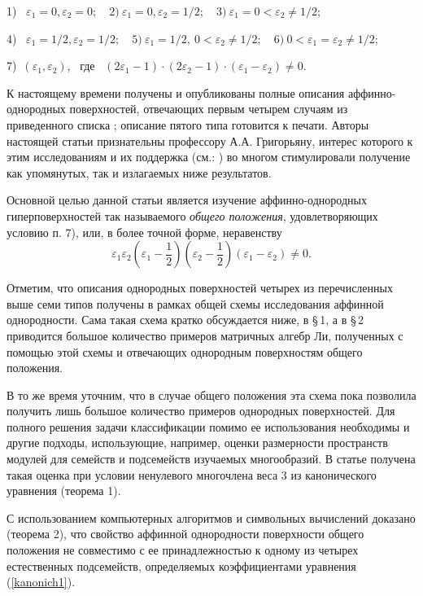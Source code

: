 1) \ $ \varepsilon_{1} = 0, \varepsilon_{2} = 0;
\quad
2) \ \varepsilon_{1} = 0, \varepsilon_{2} = 1/2;
\quad
3) \ \varepsilon_{1} = 0 < \varepsilon_{2} \ne 1/2 $;

4) \ $ \varepsilon_{1} = 1/2, \varepsilon_{2} = 1/2;
\quad
5) \ \varepsilon_{1} = 1/2, \ 0 < \varepsilon_{2} \ne 1/2;
\quad
6) \ 0 < \varepsilon_{1} = \varepsilon_{2} \ne 1/2 $;

7)\ $ (\varepsilon_{1}, \varepsilon_{2}) $, \ где
\
$ ( 2 \varepsilon_{1} - 1 )\cdot( 2 \varepsilon_{2} - 1 )\cdot
   (\varepsilon_{1} - \varepsilon_{2} ) \ne 0
$.


  К настоящему времени получены и опубликованы
полные описания аффинно-одно\-родных поверхностей,
отвечающих первым четырем случаям из приведенного списка
\cite{AtanovLob,
LobNguen,
LobShip,
NguenTTZ,
AtanLobShip};
описание пятого типа готовится к печати.
   Авторы настоящей статьи признательны профессору А.А. Григорьяну, интерес которого
к этим исследованиям и их поддержка (см.: \cite{LobBiele1, LobBiele2}) во многом стимулировали
получение как упомянутых, так и излагаемых ниже результатов.


  Основной целью данной статьи является изучение аффинно-однородных
гиперповерхностей так называемого {\it общего положения}, удовлетворяющих условию п. 7), или,
в более точной форме, неравенству
\begin{equation}
   \varepsilon_1 \varepsilon_2 \left(\varepsilon_1 - \frac12 \right)
 \left(\varepsilon_2 - \frac12 \right) (\varepsilon_1 - \varepsilon_2) \ne 0.\label{nerav.2.0}
\end{equation}

  Отметим, что описания однородных поверхностей четырех из перечисленных
выше семи типов получены в рамках
общей схемы исследования аффинной однородности.
 Сама такая схема кратко обсуждается ниже, в \S\,1, а в \S\,2 приводится
большое количество примеров матричных алгебр Ли, полученных с помощью
этой схемы и отвечающих однородным поверхностям общего положения.

   В то же время уточним, что в случае общего положения эта схема
пока позволила получить
лишь большое количество примеров однородных поверхностей.
Для полного решения задачи классификации помимо ее использования
необходимы и другие подходы, использующие, например,
оценки размерности пространств модулей для семейств и подсемейств
изучаемых многообразий.
  В статье получена такая оценка при условии ненулевого многочлена веса 3
из канонического уравнения (теорема 1).

С использованием компьютерных алгоритмов и символьных вычислений доказано
(теорема 2), что свойство аффинной однородности поверхности общего положения
не совместимо с ее принадлежностью к одному из
четырех естественных подсемейств, определяемых коэффициентами уравнения (\ref{kanonich1}).



